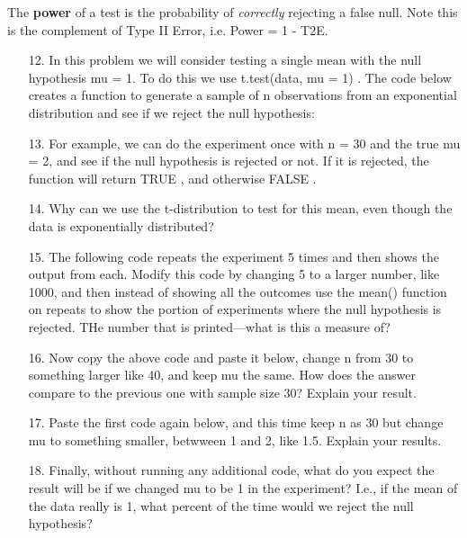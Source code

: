 \documentclass[10pt]{extarticle}
\begin{document}
\hfill 

The {\bf power} of a test is the probability of {\it correctly} rejecting a false null.  Note this is the complement of Type II Error, i.e. Power = 1 - T2E.  

\hfill 

\begin{itemize}

	\item[12.] In this problem we will consider testing a single mean with the null hypothesis mu = 1. To do this we use t.test(data, mu = 1) . The code below creates a function to generate a sample of n observations from an exponential distribution and see if we reject the null hypothesis: \\ 

	\item[13.] For example, we can do the experiment once with n = 30 and the true mu = 2, and see if the null hypothesis is rejected or not. If it is rejected, the function will return TRUE , and otherwise FALSE . \\ 

	\item[14.] Why can we use the t-distribution to test for this mean, even though the data is exponentially distributed? \\ 

	\item[15.] The following code repeats the experiment 5 times and then shows the output from each. Modify this code by changing 5 to a larger number, like 1000, and then instead of showing all the outcomes use the mean() function on repeats to show the portion of experiments where the null hypothesis is rejected. THe number that is printed---what is this a measure of? \\ 

	\item[16.] Now copy the above code and paste it below, change n from 30 to something larger like 40, and keep mu the same. How does the answer compare to the previous one with sample size 30? Explain your result. \\ 

	\item[17.] Paste the first code again below, and this time keep n as 30 but change mu to something smaller, betwween 1 and 2, like 1.5. Explain your results. \\ 

	\item[18.] Finally, without running any additional code, what do you expect the result will be if we changed mu to be 1 in the experiment? I.e., if the mean of the data really is 1, what percent of the time would we reject the null hypothesis? \\ 

\end{itemize}
\end{document}
